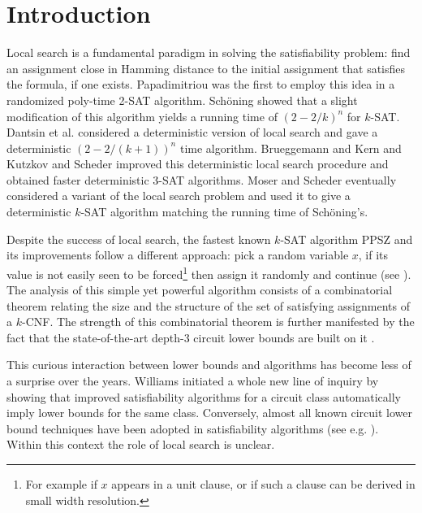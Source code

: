 \section{Introduction} \label{sec:introduction}

Local search is a fundamental paradigm in solving the satisfiability problem: find an assignment close in Hamming distance to the initial assignment that satisfies the formula, if one exists. Papadimitriou \cite{Papadimitriou91} was the first to employ this idea in a randomized poly-time 2-SAT algorithm. Sch{\" o}ning \cite{DSchoning02} showed that a slight modification of this algorithm yields a running time of $(2 - 2/k)^n$ for $k$-SAT. Dantsin et al. \cite{DantsinGHKKPRS02} considered a deterministic version of local search and gave a deterministic $(2 - 2/(k+1))^n$ time algorithm. Brueggemann and Kern \cite{BrueggemannK04} and Kutzkov and Scheder \cite{KS} improved this deterministic local search procedure and obtained faster deterministic 3-SAT algorithms. Moser and Scheder \cite{MoserS11} eventually considered a variant of the local search problem and used it to give a deterministic $k$-SAT algorithm matching the running time of Sch{\" o}ning's.

Despite the success of local search, the fastest known $k$-SAT algorithm PPSZ and its improvements follow a different approach: pick a random variable $x$, if its value is not easily seen to be forced\footnote{For example if $x$ appears in a unit clause, or if such a clause can be derived in small width resolution.} then assign it randomly and continue (see \cite{PaturiPZ99,PaturiPSZ05,Hertli14,DBLP:conf/stoc/HansenKZZ19,Scheder21}). The analysis of this simple yet powerful algorithm consists of a combinatorial theorem relating the size and the structure of the set of satisfying assignments of a $k$-CNF. The strength of this combinatorial theorem is further manifested by the fact that the state-of-the-art depth-3 circuit lower bounds are built on it \cite{PaturiPZ99,PaturiPSZ05}.

This curious interaction between lower bounds and algorithms has become less of a surprise over the years. Williams \cite{Williams13} initiated a whole new line of inquiry by showing that improved satisfiability algorithms for a circuit class automatically imply lower bounds for the same class. Conversely, almost all known circuit lower bound techniques have been adopted in satisfiability algorithms (see e.g. \cite{ImpagliazzoMP12,ChenKKSZ15}). Within this context the role of local search is unclear.

